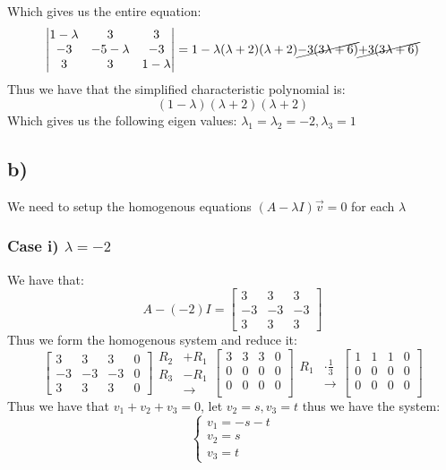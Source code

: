 \documentclass{article}
\begin{document}
Which gives us the entire equation: 
$$\begin{vmatrix}
1-\lambda & 3 & 3\\
-3 & -5-\lambda & -3\\
3 & 3& 1-\lambda
\end{vmatrix}=1-\lambda(\lambda+2)(\lambda+2) \cancel{-3(3\lambda+6)}\cancel{+3(3\lambda+6)}$$
Thus we have that the simplified characteristic polynomial is: $$(1-\lambda)(\lambda+2)(\lambda+2)$$
Which gives us the following eigen values: $\lambda_{1}=\lambda_{2}=-2,\lambda_{3}=1$
\newpage
\subsection*{b)}
We need to setup the homogenous equations $(A-\lambda I)\vec{v}=0$ for each $\lambda$
\subsubsection*{Case i) $\lambda=-2$}
We have that: $$A-(-2)I=\begin{bmatrix} 
3&3&3\\
-3&-3&-3\\
3&3&3
\end{bmatrix}$$ Thus we form the homogenous system and reduce it: $$\left[\begin{array}{ccc|c}
    3&3&3&0\\
    -3&-3&-3&0\\
    3&3&3&0
\end{array}\right]\begin{aligned}
    R_{2}&+R_{1}\\
    R_{3}&-R_{1}\\
    &\rightarrow
\end{aligned}\left[\begin{array}{ccc|c}
3&3&3&0\\
0&0&0&0\\
0&0&0&0\\
\end{array}\right]\begin{aligned}
    R_{1}&\cdot \frac{1}{3}\\
    &\rightarrow
\end{aligned}\left[\begin{array}{ccc|c}
    1&1&1&0\\
    0&0&0&0\\
    0&0&0&0\\
    \end{array}\right]$$
    Thus we have that $v_{1}+v_{2}+v_{3}=0$, let $v_{2}=s, v_{3}=t$ thus we have the system: $$\begin{cases}
    v_{1}=-s-t\\
    v_{2}=s\\
    v_{3}=t
    \end{cases}$$
\end{document}

